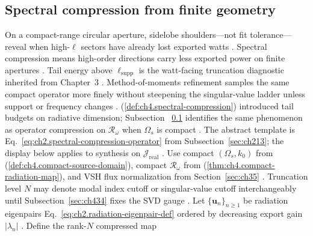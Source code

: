 \subsection{Spectral compression from finite geometry}
\label{sec:ch432}
On a compact-range circular aperture, sidelobe shoulders---not fit tolerance---reveal when high-$\ell$ sectors have already lost exported watts \cite{hansen1988}.
Spectral compression means high-order directions carry less exported power on finite apertures \cite{hansen1988}.
Tail energy above $\ell_{\mathrm{supp}}$ is the watt-facing truncation diagnostic inherited from Chapter~3 \cite{stratton1941}. Method-of-moments refinement samples the same compact operator more finely without steepening the singular-value ladder unless support or frequency changes \cite{harrington2001}.
\medskip
(\ref{def:ch4.spectral-compression}) introduced tail budgets on radiative dimension; Subsection
~\ref{sec:ch432} identifies the same phenomenon as operator compression on \(\mathcal{R}_\omega\) when
\(\Omega_{s}\) is compact \cite{stratton1941}. The abstract template is
Eq.~\eqref{eq:ch2.spectral-compression-operator} from Subsection~\ref{sec:ch213}; the display below
applies to synthesis on \(\mathcal{J}_{\mathrm{real}}\) \cite{hansen1988}.
Use compact \((\Omega_{s},k_{0})\) from (\ref{def:ch4.compact-source-domain}), compact
\(\mathcal{R}_\omega\) from (\ref{thm:ch4.compact-radiation-map}), and VSH flux normalization from
Section~\ref{sec:ch35} \cite{stratton1941}. Truncation level \(N\) may denote modal index cutoff or
singular-value cutoff interchangeably until Subsection~\ref{sec:ch434} fixes the SVD gauge \cite{harrington2001}.
Let \(\{\mathbf{u}_{n}\}_{n\ge1}\) be radiation eigenpairs Eq.~\eqref{eq:ch2.radiation-eigenpair-def} ordered by
decreasing export gain \(|\lambda_{n}|\) \cite{stratton1941}. Define the rank-\(N\) compressed map
